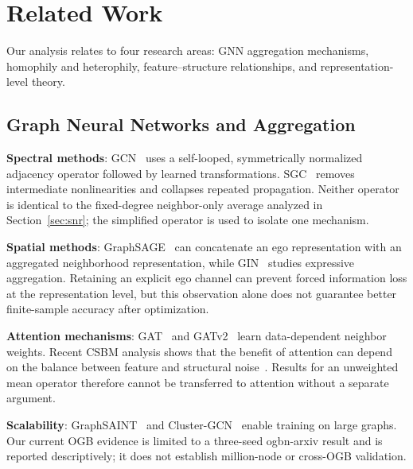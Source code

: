 
\section{Related Work}
\label{sec:related}

Our analysis relates to four research areas: GNN aggregation mechanisms, homophily and heterophily, feature--structure relationships, and representation-level theory.

\subsection{Graph Neural Networks and Aggregation}

\textbf{Spectral methods}: GCN~\cite{kipf2017gcn} uses a self-looped, symmetrically normalized adjacency operator followed by learned transformations. SGC~\cite{wu2019sgc} removes intermediate nonlinearities and collapses repeated propagation. Neither operator is identical to the fixed-degree neighbor-only average analyzed in Section~\ref{sec:snr}; the simplified operator is used to isolate one mechanism.

\textbf{Spatial methods}: GraphSAGE~\cite{hamilton2017graphsage} can concatenate an ego representation with an aggregated neighborhood representation, while GIN~\cite{xu2019gin} studies expressive aggregation. Retaining an explicit ego channel can prevent forced information loss at the representation level, but this observation alone does not guarantee better finite-sample accuracy after optimization.

\textbf{Attention mechanisms}: GAT~\cite{velivckovic2018gat} and GATv2~\cite{brody2022gatv2} learn data-dependent neighbor weights. Recent CSBM analysis shows that the benefit of attention can depend on the balance between feature and structural noise~\cite{pmlr-v267-ma25w}. Results for an unweighted mean operator therefore cannot be transferred to attention without a separate argument.

\textbf{Scalability}: GraphSAINT~\cite{zeng2020graphsaint} and Cluster-GCN~\cite{chiang2019clustergcn} enable training on large graphs. Our current OGB evidence is limited to a three-seed ogbn-arxiv result and is reported descriptively; it does not establish million-node or cross-OGB validation.

